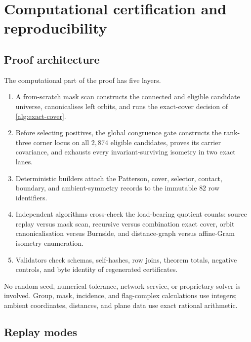 \section{Computational certification and reproducibility}
\label{sec:reproducibility}

\subsection{Proof architecture}

The computational part of the proof has five layers.
\begin{enumerate}[label=(\arabic*),leftmargin=2.2em]
\item A from-scratch mask scan constructs the connected and eligible
candidate universe, canonicalises left orbits, and runs the exact-cover
decision of \cref{alg:exact-cover}.
\item Before selecting positives, the global congruence gate constructs the
rank-three corner locus on all $2{,}874$ eligible candidates, proves its
carrier covariance, and exhausts every invariant-surviving isometry in two
exact lanes.
\item Deterministic builders attach the Patterson, cover, selector, contact,
boundary, and ambient-symmetry records to the immutable $82$ row identifiers.
\item Independent algorithms cross-check the load-bearing quotient counts:
source replay versus mask scan, recursive versus combination exact cover,
orbit canonicalisation versus Burnside, and distance-graph versus affine-Gram
isometry enumeration.
\item Validators check schemas, self-hashes, row joins, theorem totals,
negative controls, and byte identity of regenerated certificates.
\end{enumerate}

No random seed, numerical tolerance, network service, or proprietary solver
is involved.  Group, mask, incidence, and flag-complex calculations use
integers; ambient coordinates, distances, and plane data use exact rational
arithmetic.

\subsection{Replay modes}

